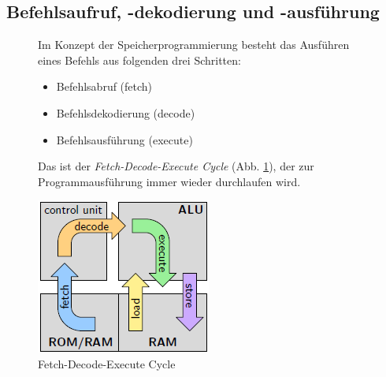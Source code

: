 \documentclass[12pt]{report}
\begin{document}
\subsection{Befehlsaufruf, -dekodierung und -ausführung}
\begin{figure}[H]
  \begin{minipage}[t]{0.45\textwidth}
    Im Konzept der Speicherprogrammierung besteht das Ausführen eines Befehls aus folgenden drei Schritten:
    
    \begin{itemize}
      \item Befehlsabruf (fetch)
      \item Befehlsdekodierung (decode)
      \item Befehlsausführung (execute)
    \end{itemize}
    
    Das ist der \textit{Fetch-Decode-Execute Cycle} (Abb. \ref{fig:fetch-decode-rxecute_cycle}), der zur Programmausführung immer wieder durchlaufen wird.
  \end{minipage}
  \hfill
  \begin{minipage}[t]{0.45\textwidth}
    \caption{Fetch-Decode-Execute Cycle}
    \label{fig:fetch-decode-rxecute_cycle}
    \includegraphics{fetch-decode-rxecute_cycle}
  \end{minipage}
\end{figure}
\end{document}
